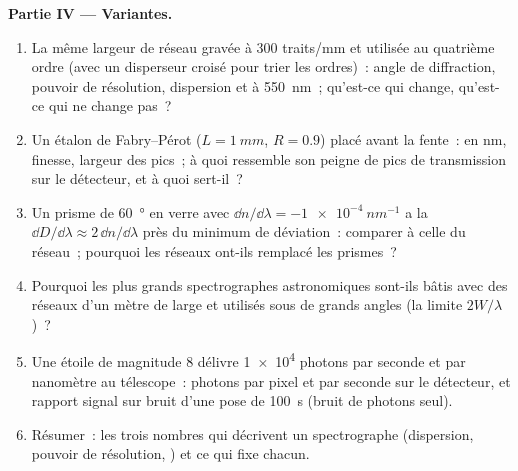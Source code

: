 \begin{problem}
\medskip
\noindent\textbf{Partie IV --- Variantes.}
\begin{enumerate}[resume]
  \item La même largeur de réseau gravée à $300$ traits/mm et utilisée au
        quatrième ordre (avec un disperseur croisé pour trier les ordres)~:
        angle de diffraction, pouvoir de résolution, dispersion et  à \qty{550}{nm}~; qu'est-ce qui change, qu'est-ce qui ne change pas~?
  \item Un étalon de Fabry--Pérot ($L = \qty{1}{mm}$, $R = 0.9$) placé avant
        la fente~:  en nm, finesse, largeur des pics~; à quoi
        ressemble son peigne de pics de transmission sur le détecteur,
        et à quoi sert-il~?
  \item Un prisme de \qty{60}{\degree} en verre avec $\dd n/\dd\lambda = \qty{-1e-4}{nm^{-1}}$
        a la  $\dd D/\dd\lambda \approx 2\,\dd n/\dd\lambda$ près du
        minimum de déviation~: comparer à celle du réseau~; pourquoi les réseaux
        ont-ils remplacé les prismes~?
  \item Pourquoi les plus grands spectrographes astronomiques sont-ils bâtis avec des
        réseaux d'un mètre de large et utilisés sous de grands angles (la limite
        $2W/\lambda$)~?
  \item Une étoile de magnitude 8 délivre \qty{1e4}{} photons par seconde et
        par nanomètre au télescope~: photons par pixel et par seconde
        sur le détecteur, et rapport signal sur bruit d'une pose de \qty{100}{s}
        (bruit de photons seul).
  \item Résumer~: les trois nombres qui décrivent un spectrographe
        (dispersion, pouvoir de résolution, ) et ce qui
        fixe chacun.
\end{enumerate}
\end{problem}
